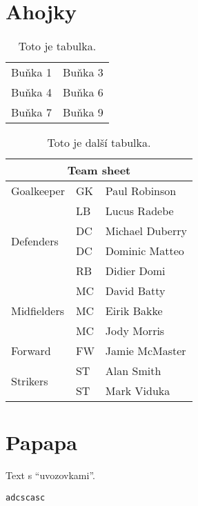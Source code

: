 \documentclass[a4paper,pdftex,12pt]{article}
\begin{document}
\upmaketitle
\upthanksanot
\uptableofcontents
\upprintlists

\section{Ahojky}
\begin{table}[ht]
  \begin{center}
    \begin{tabular}{||l|r||}
      Buňka 1 & Buňka 3 \\
      Buňka 4 & Buňka 6 \\
      Buňka 7 & Buňka 9 \\
      \hline
    \end{tabular}
    \caption{Toto je tabulka.}
  \end{center}
\end{table}
\begin{table}
\begin{center}
\begin{tabular}{|l|l|l|}
\hline
\multicolumn{3}{|c|}{Team sheet} \\
\hline
 Goalkeeper & GK & Paul Robinson \\ \hline
\multirow{4}{*}{Defenders} & LB & Lucus Radebe \\
  & DC & Michael Duberry \\
  & DC & Dominic Matteo \\
  & RB & Didier Domi \\ \hline
\multirow{3}{*}{Midfielders} & MC & David Batty \\
  & MC & Eirik Bakke \\
  & MC & Jody Morris \\ \hline
 Forward & FW & Jamie McMaster \\ \hline
\multirow{2}{*}{Strikers} & ST & Alan Smith \\
  & ST & Mark Viduka \\
\hline
\end{tabular}
\caption{Toto je další tabulka.}
\end{center}
\end{table}

\section{Papapa}
Text s \enquote{uvozovkami}.

\begin{lstlisting}[caption={Kód}]
adcscasc
\end{lstlisting}


\begin{upconclusions}[czech]
\end{upconclusions}

\begin{upconclusions}[english]
\end{upconclusions}

\upprintbibliography
\end{document}
